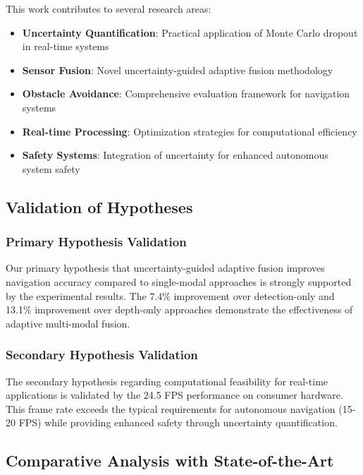\documentclass[12pt,oneside]{book}
\begin{document}
This work contributes to several research areas:

\begin{itemize}
\item \textbf{Uncertainty Quantification}: Practical application of Monte Carlo dropout in real-time systems
\item \textbf{Sensor Fusion}: Novel uncertainty-guided adaptive fusion methodology
\item \textbf{Obstacle Avoidance}: Comprehensive evaluation framework for navigation systems
\item \textbf{Real-time Processing}: Optimization strategies for computational efficiency
\item \textbf{Safety Systems}: Integration of uncertainty for enhanced autonomous system safety
\end{itemize}

\subsection{Validation of Hypotheses}

\subsubsection{Primary Hypothesis Validation}

Our primary hypothesis that uncertainty-guided adaptive fusion improves navigation accuracy compared to single-modal approaches is strongly supported by the experimental results. The 7.4\% improvement over detection-only and 13.1\% improvement over depth-only approaches demonstrate the effectiveness of adaptive multi-modal fusion.

\subsubsection{Secondary Hypothesis Validation}

The secondary hypothesis regarding computational feasibility for real-time applications is validated by the 24.5 FPS performance on consumer hardware. This frame rate exceeds the typical requirements for autonomous navigation (15-20 FPS) while providing enhanced safety through uncertainty quantification.

\subsection{Comparative Analysis with State-of-the-Art}
\end{document}
